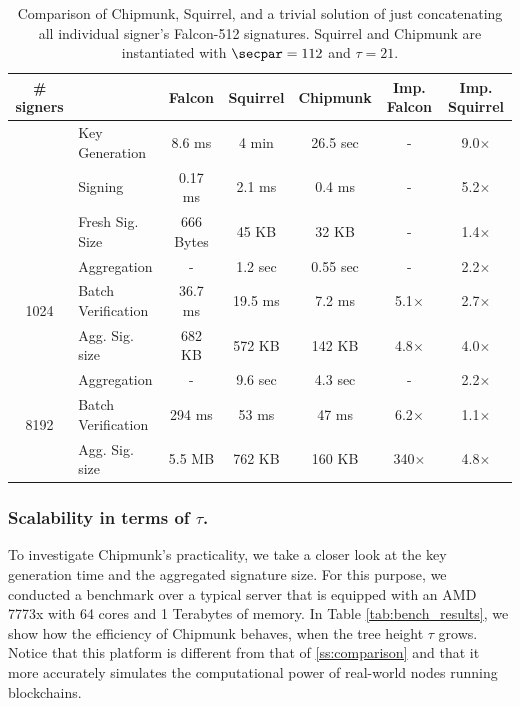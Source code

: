 \begin{table}\centering
  \begin{tabular}{clccccc}
    \# signers      &                 & Falcon      & Squirrel  & Chipmunk  & Imp. Falcon & Imp. Squirrel \\\toprule
    \multirow{2}{*}{} 
                    & Key Generation  & 8.6 ms      & 4 min     & 26.5 sec  &     -       & 9.0$\times$ \\%
                    & Signing         & 0.17 ms     & 2.1 ms    & 0.4 ms    &     -       & 5.2$\times$ \\%
                    &Fresh Sig. Size  & 666 Bytes   & 45 KB     & 32 KB     &     -       & 1.4$\times$ \\\midrule
    \multirow{3}{*}{1024}                
                    &Aggregation      & -           & 1.2 sec   & 0.55 sec  &     -       & 2.2$\times$ \\%
                    &Batch Verification    
                                      & 36.7 ms     & 19.5 ms   & 7.2 ms    & 5.1$\times$ & 2.7$\times$ \\%
                    
                    &Agg. Sig. size   & 682 KB      & 572 KB    & 142 KB    & 4.8$\times$ & 4.0$\times$ \\\midrule
    \multirow{3}{*}{8192}                
                    &Aggregation      & -           & 9.6 sec   & 4.3 sec   &     -       & 2.2$\times$ \\%
                    &Batch Verification    
                                      & 294 ms      & 53  ms    &  47 ms    & 6.2$\times$ & 1.1$\times$ \\%
                    &Agg. Sig. size   & 5.5 MB      & 762 KB    & 160 KB    & 340$\times$ & 4.8$\times$\\ \bottomrule
  \end{tabular}
  \caption{Comparison of Chipmunk, Squirrel, and a trivial solution of just concatenating all individual signer's Falcon-512 signatures. Squirrel and Chipmunk are instantiated with $\secpar = 112$ and $\tau=21$.}\label{tab:benchmarksizes}
\end{table}

\subsubsection{Scalability in terms of $\tau$.}
To investigate Chipmunk's practicality, we take a closer look at the key generation time and the aggregated signature size.
For this purpose, we conducted a benchmark over a typical server that is equipped with an AMD 7773x with 64 cores and 1 Terabytes of memory.
In Table \ref{tab:bench_results}, we show how the efficiency of Chipmunk behaves, when the tree height $\tau$ grows.
Notice that this platform is different from that of \autoref{ss:comparison} and that it more accurately simulates the computational power of real-world nodes running blockchains.


